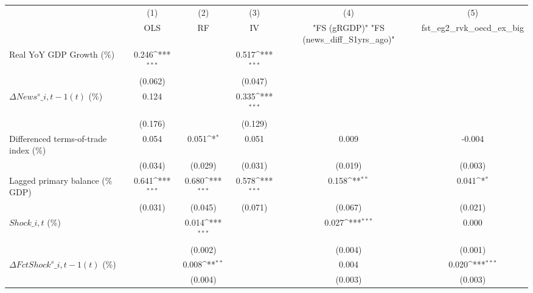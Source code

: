 {
\def\sym#1{\ifmmode^{#1}\else\(^{#1}\)\fi}
\begin{tabular}{l*{5}{c}}
\toprule
                    &\multicolumn{1}{c}{(1)}&\multicolumn{1}{c}{(2)}&\multicolumn{1}{c}{(3)}&\multicolumn{1}{c}{(4)}&\multicolumn{1}{c}{(5)}\\
                    &\multicolumn{1}{c}{OLS}&\multicolumn{1}{c}{RF}&\multicolumn{1}{c}{IV}&\multicolumn{1}{c}{ "FS (gRGDP)"  "FS (news\_diff\_S1yrs\_ago)" }&\multicolumn{1}{c}{fst\_eg2\_rvk\_oecd\_ex\_big}\\
\midrule
Real YoY GDP Growth (\%)&       0.246\sym{***}&                     &       0.517\sym{***}&                     &                     \\
                    &     (0.062)         &                     &     (0.047)         &                     &                     \\
\addlinespace
$ \Delta News^s\_{i,t-1}(t)$ (\%)&       0.124         &                     &       0.335\sym{***}&                     &                     \\
                    &     (0.176)         &                     &     (0.129)         &                     &                     \\
\addlinespace
Differenced terms-of-trade index (\%)&       0.054         &       0.051\sym{*}  &       0.051         &       0.009         &      -0.004         \\
                    &     (0.034)         &     (0.029)         &     (0.031)         &     (0.019)         &     (0.003)         \\
\addlinespace
Lagged primary balance (\% GDP)&       0.641\sym{***}&       0.680\sym{***}&       0.578\sym{***}&       0.158\sym{**} &       0.041\sym{*}  \\
                    &     (0.031)         &     (0.045)         &     (0.071)         &     (0.067)         &     (0.021)         \\
\addlinespace
$ Shock\_{i,t}$ (\%) &                     &       0.014\sym{***}&                     &       0.027\sym{***}&       0.000         \\
                    &                     &     (0.002)         &                     &     (0.004)         &     (0.001)         \\
\addlinespace
$ \Delta FctShock^s\_{i,t-1}(t)$ (\%)&                     &       0.008\sym{**} &                     &       0.004         &       0.020\sym{***}\\
                    &                     &     (0.004)         &                     &     (0.003)         &     (0.003)         \\

\end{tabular}}
